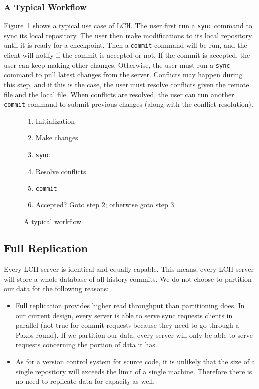 \documentclass[11pt]{article}
\begin{document}
\subsubsection{A Typical Workflow}
Figure~\ref{fig:2} shows a typical use case of LCH.
The user first run a \texttt{sync} command to sync its local repository.
The user then make modifications to its local repository until it is ready for a checkpoint.
Then a \texttt{commit} command will be run, and the client will notify if the commit is accepted or not.
If the commit is accepted, the user can keep making other changes.
Otherwise, the user must run a \texttt{sync} command to pull latest changes from the server.
Conflicts may happen during this step, and if this is the case, the user must resolve conflicts given the remote file and the local file.
When conflicts are resolved, the user can run another \texttt{commit} command to submit previous changes (along with the conflict resolution).

\begin{figure}[ht!]
    \centering
    \begin{varwidth}{\textwidth}
\begin{enumerate}
    \item Initialization
    \item Make changes
    \item \texttt{sync}
    \item Resolve conflicts
    \item \texttt{commit}
    \item Accepted? Goto step $2$; otherwise goto step $3$.
\end{enumerate}
\end{varwidth}
\caption{A typical workflow}
    \label{fig:2}
\end{figure}


\subsection{Full Replication}
Every LCH server is identical and equally capable.
This means, every LCH server will store a whole database of all history commits.
We do not choose to partition our data for the following reasons:
\begin{itemize}
    \item Full replication provides higher read throughput than partitioning does.
        In our current design, every server is able to serve sync requests clients in parallel
        (not true for commit requests because they need to go through a Paxos round).
        If we partition our data, every server will only be able to serve requests concerning the portion of data it has.
    \item As for a version control system for source code, it is unlikely that the size of a single repository will exceeds the limit of a single machine.
        Therefore there is no need to replicate data for capacity as well.
\end{itemize}
\end{document}
